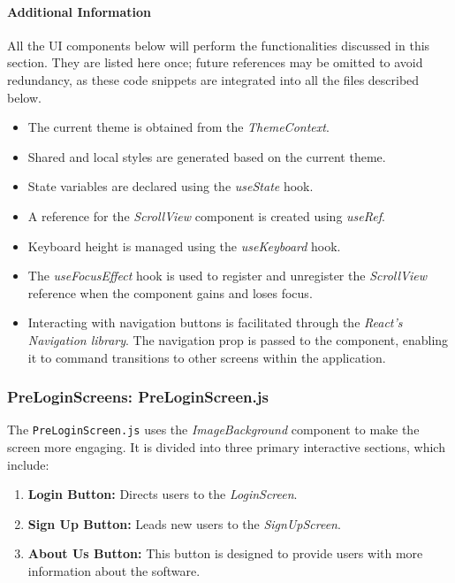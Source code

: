 \paragraph{Additional Information}

All the UI components below will perform the functionalities discussed in this section. They are listed here once; future references may be omitted to avoid redundancy, as these code snippets are integrated into all the files described below.

\begin{itemize}
    \item The current theme is obtained from the \textit{ThemeContext}.
    \item Shared and local styles are generated based on the current theme.
    \item State variables are declared using the \textit{useState} hook.
    \item A reference for the \textit{ScrollView} component is created using \textit{useRef}.
    \item Keyboard height is managed using the \textit{useKeyboard} hook.
    \item The \textit{useFocusEffect} hook is used to register and unregister the \textit{ScrollView} reference when the component gains and loses focus.
    \item Interacting with navigation buttons is facilitated through the \textit{React's Navigation library}. The navigation prop is passed to the component, enabling it to command transitions to other screens within the application.
\end{itemize}

\subsubsection{PreLoginScreens: PreLoginScreen.js}

The \texttt{PreLoginScreen.js} uses the \textit{ImageBackground} component to make the screen more engaging. It is divided into three primary interactive sections, which include:

\begin{enumerate}
    \item \textbf{Login Button:} Directs users to the \textit{LoginScreen}.
    \item \textbf{Sign Up Button:} Leads new users to the \textit{SignUpScreen}.
    \item \textbf{About Us Button:} This button is designed to provide users with more information about the software. 
\end{enumerate}

